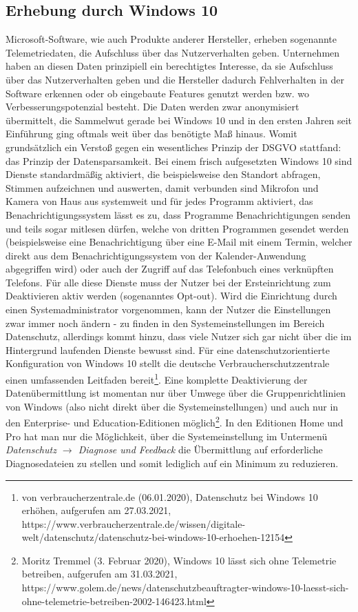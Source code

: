\subsection{Erhebung durch Windows 10}
Microsoft-Software, wie auch Produkte anderer Hersteller, erheben sogenannte Telemetriedaten, die Aufschluss über das Nutzerverhalten geben. Unternehmen haben an diesen Daten prinzipiell ein berechtigtes Interesse, da sie Aufschluss über das Nutzerverhalten geben und die Hersteller dadurch Fehlverhalten in der Software erkennen oder ob eingebaute Features genutzt werden bzw. wo Verbesserungspotenzial besteht. Die Daten werden zwar anonymisiert übermittelt, die Sammelwut gerade bei Windows 10 und in den ersten Jahren seit Einführung ging oftmals weit über das benötigte Maß hinaus. Womit grundsätzlich ein Verstoß gegen ein wesentliches Prinzip der DSGVO stattfand: das Prinzip der Datensparsamkeit. Bei einem frisch aufgesetzten Windows 10 sind Dienste standardmäßig aktiviert, die beispielsweise den Standort abfragen, Stimmen aufzeichnen und auswerten, damit verbunden sind Mikrofon und Kamera von Haus aus systemweit und für jedes Programm aktiviert, das Benachrichtigungssystem lässt es zu, dass Programme Benachrichtigungen senden und teils sogar mitlesen dürfen, welche von dritten Programmen gesendet werden (beispielsweise eine Benachrichtigung über eine E-Mail mit einem Termin, welcher direkt aus dem Benachrichtigungssystem von der Kalender-Anwendung abgegriffen wird) oder auch der Zugriff auf das Telefonbuch eines verknüpften Telefons. Für alle diese Dienste muss der Nutzer bei der Ersteinrichtung zum Deaktivieren aktiv werden (sogenanntes Opt-out). Wird die Einrichtung durch einen Systemadministrator vorgenommen, kann der Nutzer die Einstellungen zwar immer noch ändern - zu finden in den Systemeinstellungen im Bereich \glqq Datenschutz\grqq{}, allerdings kommt hinzu, dass viele Nutzer sich gar nicht über die im Hintergrund laufenden Dienste bewusst sind. Für eine datenschutzorientierte Konfiguration von Windows 10 stellt die deutsche Verbraucherschutzzentrale einen umfassenden Leitfaden bereit\footnote{von verbraucherzentrale.de (06.01.2020), Datenschutz bei Windows 10 erhöhen, aufgerufen am 27.03.2021, https://www.verbraucherzentrale.de/wissen/digitale-welt/datenschutz/datenschutz-bei-windows-10-erhoehen-12154}. Eine komplette Deaktivierung der Datenübermittlung ist momentan nur über Umwege über die Gruppenrichtlinien von Windows (also nicht direkt über die Systemeinstellungen) und auch nur in den Enterprise- und Education-Editionen möglich\footnote{Moritz Tremmel (3. Februar 2020), Windows 10 lässt sich ohne Telemetrie betreiben, aufgerufen am 31.03.2021, https://www.golem.de/news/datenschutzbeauftragter-windows-10-laesst-sich-ohne-telemetrie-betreiben-2002-146423.html}. In den Editionen Home und Pro hat man nur die Möglichkeit, über die Systemeinstellung im Untermenü \textit{Datenschutz $\rightarrow$ Diagnose und Feedback} die Übermittlung auf \glqq erforderliche Diagnosedateien\grqq{} zu stellen und somit lediglich auf ein Minimum zu reduzieren.

